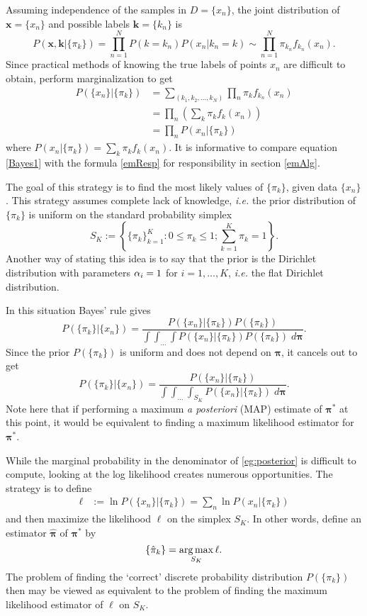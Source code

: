 Assuming independence of the samples in \( D = \{x_n\} \), the joint distribution of $\bm x = \{x_n\}$ and possible labels $\bm k = \{k_n\}$ is 
\[P(\bm x, \bm k |\{\pi_k\})=\prod_{n=1}^{N} P(k=k_n)P(x_n|k_n=k) \sim\prod_{n=1}^{N} \pi_{k_n}f_{k_n}(x_n).\]
Since practical methods of knowing the true labels of points $x_n$ are difficult to obtain, perform marginalization to get
\begin{align*}
P(\{x_n\}|\{\pi_k\})&=\sum_{(k_1,k_2,\ldots,k_N)}\prod_n \pi_{k}f_{k_n}(x_n)\\
&= \prod_n \left(\sum_{k}\pi_kf_k(x_n)\right)\\
&= \prod_n P(x_n|\{\pi_k\})
\end{align*}
where $\displaystyle{P(x_n|\{\pi_k\}) =\sum_{k}\pi_kf_k(x_n)}$.  It is informative to compare equation \eqref{Bayes1} with the formula \eqref{emResp} for responsibility in section \ref{emAlg}.

The goal of this strategy is to find the most likely values of $\{\pi_k\}$, given data $\{x_n\}$. This strategy assumes complete lack of knowledge, \textit{i.e.} the prior distribution of $\{\pi_k\}$ is uniform on the standard probability simplex 
\begin{equation}\label{simplexDef}
	S_K:=\left\{\{\pi_k\}_{k=1}^{K}:0\leq \pi_k\leq 1; \sum_{k=1}^{K}\pi_k =1\right\}.
\end{equation}
Another way of stating this idea is to say that the prior is the Dirichlet distribution with parameters \( \alpha_i = 1 \) for \( i=1,\ldots,K \), \textit{i.e.} the flat Dirichlet distribution.

In this situation Bayes' rule gives
\[P(\{\pi_k\}|\{x_n\})=\frac{P(\{x_n\}|\{\pi_k\})P(\{\pi_k\})}{\int\int_{\ldots}\int P(\{x_n\}|\{\pi_k\})P(\{\pi_k\})\; d\bm\pi}.\]
Since the prior $P(\{\pi_k\})$ is uniform and does not depend on \( \bm \pi \), it cancels out to get
\begin{equation}\label{eg:posterior}
 P(\{\pi_k\}|\{x_n\})=\frac{P(\{x_n\}|\{\pi_k\})}{\int\int_{\ldots}\int_{S_K} P(\{x_n\}|\{\pi_k\})\; d\bm\pi}.
\end{equation}
Note here that if performing a maximum \textit{a posteriori} (MAP) estimate of \( \bm\pi^{\ast} \) at this point, it would be equivalent to finding a maximum likelihood estimator for $\bm\pi^\ast$.

While the marginal probability in the denominator of \ref{eg:posterior} is difficult to compute, looking at the log likelihood creates numerous opportunities.  The strategy is to define
\begin{align}\label{eqn:ObjFunc}
\ell&:= \ln P(\{x_n\}|\{\pi_k\}) = \sum_n \ln P(x_n|\{\pi_k\})
\end{align}
and then maximize the likelihood \(\ell \) on the simplex $S_K$.
In other words, define an estimator \( \hat{\bm \pi} \) of \( \bm\pi^{\ast} \) by
\[\{\hat{\pi}_k\}=\operatorname*{arg\,max}_{S_K} \ell.\]
The problem of finding the `correct' discrete probability distribution $P(\{\pi_k\})$ then may be viewed as equivalent to the problem of finding the maximum likelihood estimator of $\ell$ on \( S_K \).  

